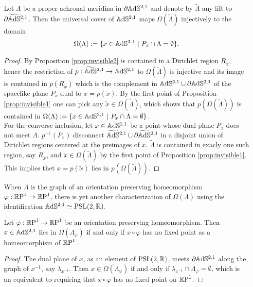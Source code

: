 \begin{proposition}\label{prop:invisible in ads}
    Let $\Lambda$ be a proper achronal meridina in $\partial\A^{2,1}$ and denote by $\widetilde{\Lambda}$ any lift to $\partial\AS^{2,1}$. Then the universal cover of $\A^{2,1}$ maps $\Omega(\widetilde{\Lambda})$ injectively to the domain
    \[
        \Omega(\Lambda) := \{ x\in \A^{2,1} \ | \ P_x \cap \Lambda = \emptyset \}.
    \]
\end{proposition}
\begin{proof}
    By Proposition \ref{prop:invisible2} is contained in a Dirichlet region $R_{\widetilde{x}}$, hence the restriction of $p : \AS^{2,1} \to \A^{2,1}$ to $\Omega(\widetilde{\Lambda})$ is injective and its image is contained in $p(R_{\widetilde{x}})$ which is the complement in $\A^{2,1} \cup \partial\A^{2,1}$ of the spacelike plane $P_x$ dual to $x=p(\widetilde{x})$. By the first point of Proposition \ref{prop:invisible1} one can pick any $\widetilde{x} \in \Omega(\widetilde{\Lambda})$, which shows that $p(\Omega(\widetilde{\Lambda}))$ is contained in $\Omega(\Lambda) := \{ x\in \A^{2,1} \ | \ P_x \cap \Lambda = \emptyset \}$.\\
    For the converse inclusion, let $x \in \A^{2,1}$ be a point whose dual plane $P_x$ does not meet $\Lambda$. $p^{-1}(P_x)$ disconnect $\AS^{2,1} \cup \partial\AS^{2,1}$ in a disjoint union of Dirichlet regions centered at the preimages of $x$. $\widetilde{\Lambda}$ is contained in exacly one such region, say $R_{\widetilde{x}}$, and $\widetilde{x} \in \Omega(\widetilde{\Lambda})$ by the first point of Proposition \ref{prop:invisible1}. This implies thet $x = p(\widetilde{x})$ lies in $p(\Omega(\widetilde{\Lambda}))$.
\end{proof}
When $\Lambda$ is the graph of an orientation preserving homeomorphism $\varphi : \S \to \S$, there is yet another characterization of $\Omega(\Lambda)$ using the identification $\A^{2,1} \simeq \PSL$.
\begin{corollary}\label{cor:invisible in ads}
    Let $\varphi :\S\to\S$ be an orientation preserving homeomorphism. Then $x\in \A^{2,1}$ lies in $\Omega(\Lambda_\varphi)$ if and only if $x \circ \varphi$ has no fixed point as a homeomorphism of $\S$.
\end{corollary}
\begin{proof}
    The dual plane of $x$, as an element of $\PSL$, meets $\partial\A^{2,1}$ along the graph of $x^{-1}$, say $\lambda_{x^{-1}}$. Then $x \in \Omega(\Lambda_\varphi)$ if and only if $\lambda_{x^{-1}} \cap \Lambda_\varphi = \emptyset$, which is an equivalent to requiring that $x \circ \varphi$ has no fixed point on $\S$.
\end{proof}

